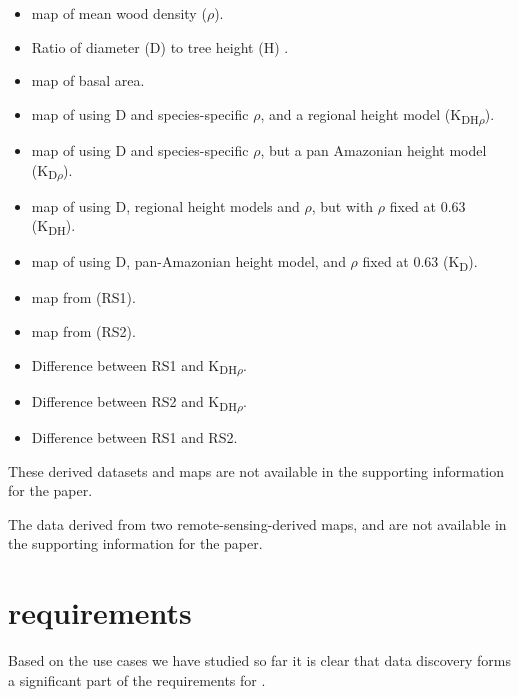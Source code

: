 \documentclass{article}
\begin{document}
\begin{itemize}
    \item \cite{kriged} map of mean wood density ($\rho$).
    \item Ratio of diameter (D) to tree height (H) \cite{feldpausch-2012}.
    \item \cite{kriged} map of basal area.
    \item \cite{kriged} map of \cite{term-agb} using D and species-specific
    $\rho$, and a regional height model (K\textsubscript{DH$\rho$}).
    \item \cite{kriged} map of \cite{term-agb} using D and species-specific
    $\rho$, but a pan Amazonian height model (K\textsubscript{D$\rho$}).
    \item \cite{kriged} map of \cite{term-agb} using D, regional height
    models and $\rho$, but with $\rho$ fixed at 0.63 (K\textsubscript{DH}).
    \item \cite{kriged} map of \cite{term-agb} using D, pan-Amazonian height
    model, and $\rho$ fixed at 0.63 (K\textsubscript{D}).
\end{itemize}

\begin{itemize}
    \item \cite{term-agb} map from \cite{saatchi-2011} (RS1).
    \item \cite{term-agb} map from \cite{baccini-2012} (RS2).
    \item Difference between RS1 and K\textsubscript{DH$\rho$}.
    \item Difference between RS2 and K\textsubscript{DH$\rho$}.
    \item Difference between RS1 and RS2.
\end{itemize}

These derived datasets and maps are not available in the supporting
information for the paper.

The \cite{term-agb} data derived from two remote-sensing-derived maps,
\cite{saatchi-2011} and \cite{baccini-2012} are not available in the
supporting information for the paper.

\section{\cite{trop} requirements}

Based on the \cite{trop} use cases we have studied so far it is clear that
data discovery forms a significant part of the requirements for \cite{trop}.
\end{document}
